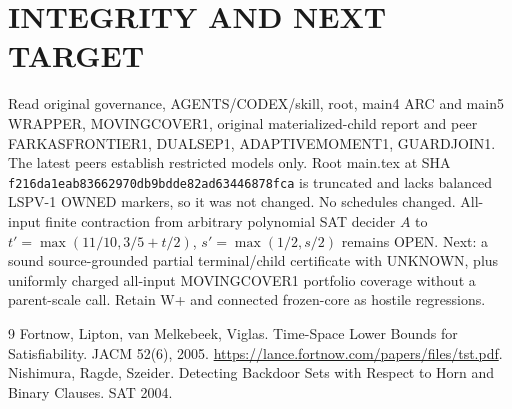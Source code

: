 \documentclass[11pt]{article}
\begin{document}
\section{INTEGRITY AND NEXT TARGET}
Read original governance, AGENTS/CODEX/skill, root, main4 ARC and main5 WRAPPER, MOVINGCOVER1, original materialized-child report and peer FARKASFRONTIER1, DUALSEP1, ADAPTIVEMOMENT1, GUARDJOIN1. The latest peers establish restricted models only. Root main.tex at SHA \texttt{f216da1eab83662970db9bdde82ad63446878fca} is truncated and lacks balanced LSPV-1 OWNED markers, so it was not changed. No schedules changed. All-input finite contraction from arbitrary polynomial SAT decider \(A\) to \(t'=\max(11/10,3/5+t/2)\), \(s'=\max(1/2,s/2)\) remains OPEN. Next: a sound source-grounded partial terminal/child certificate with UNKNOWN, plus uniformly charged all-input MOVINGCOVER1 portfolio coverage without a parent-scale call. Retain W+ and connected frozen-core as hostile regressions.
\begin{thebibliography}{9}
 Fortnow, Lipton, van Melkebeek, Viglas. Time-Space Lower Bounds for Satisfiability. JACM 52(6), 2005. \url{https://lance.fortnow.com/papers/files/tst.pdf}.
 Nishimura, Ragde, Szeider. Detecting Backdoor Sets with Respect to Horn and Binary Clauses. SAT 2004.
\end{thebibliography}
\end{document}
